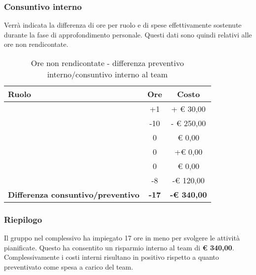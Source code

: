 		\subsubsection{Consuntivo interno} %
		\label{ssub:consuntivo}
		Verrà indicata la differenza di ore per ruolo e di spese effettivamente sostenute durante la fase di approfondimento personale. Questi dati sono quindi relativi alle ore non rendicontate. \newline
		\begin{table}[!h]
			\begin{center}
				\begin{tabularx}{0.75\textwidth}{|X|c|c|}
					\hline
					\textbf{Ruolo} & \textbf{Ore} & \textbf{Costo} \\
					\hline
					\roleProjectManager & +1 & + \euro{} 30,00 \\
					\hline
					\roleAnalyst & -10 & - \euro{} 250,00 \\
					\hline
					\roleDesigner & 0 & \euro{} 0,00 \\
					\hline
					\roleAdministrator & 0  & +\euro{} 0,00 \\
					\hline
					\roleProgrammer & 0 & \euro{} 0,00 \\
					\hline
					\roleVerifier & -8 & -\euro{} 120,00 \\
					\hline
					\textbf{Differenza consuntivo/preventivo} & \textbf{-17} & \textbf{-\euro{} 340,00} \\
					\hline
				\end{tabularx}
			\end{center}
		\caption{Ore non rendicontate - differenza preventivo interno/consuntivo interno al team}
		\end{table}

		\subsubsection{Riepilogo} %
		\label{ssub:riepilogo}
		Il gruppo nel complessivo ha impiegato 17 ore in meno per svolgere le attività pianificate. \newline
		Questo ha consentito un risparmio interno al team di \textbf{\euro{} 340,00}. Complessivamente i costi interni risultano in positivo rispetto a quanto preventivato come spesa a carico del team.
